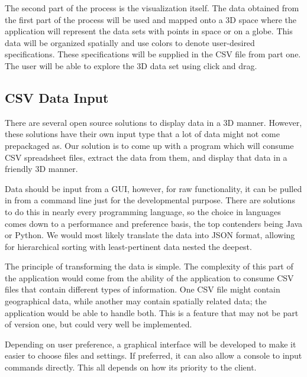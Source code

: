 \documentclass[journal,10pt,onecolumn,compsoc]{IEEEtran} \usepackage[margin=1.0in]{geometry} \usepackage{pdfpages}
\begin{document}
\noindent \newline The second part of the process is the visualization itself. The data obtained from the first part of the process will be used and mapped onto a 3D space where the application will represent the data sets with points in space or on a globe. This data will be organized spatially and use colors to denote user-desired specifications. These specifications will be supplied in the CSV file from part one. The user will be able to explore the 3D data set using click and drag.
    
    \subsection{CSV Data Input}
    There are several open source solutions to display data in a 3D manner. However, these solutions have their own input type that a lot of data might not come prepackaged as. Our solution is to come up with a program which will consume CSV spreadsheet files, extract the data from them, and display that data in a friendly 3D manner.
    
    \noindent \newline Data should be input from a GUI, however, for raw functionality, it can be pulled in from a command line just for the developmental purpose. There are solutions to do this in nearly every programming language, so the choice in languages comes down to a performance and preference basis, the top contenders being Java or Python. We would most likely translate the data into JSON format, allowing for hierarchical sorting with least-pertinent data nested the deepest.
    
    \noindent \newline The principle of transforming the data is simple. The complexity of this part of the application would come from the ability of the application to consume CSV files that contain different types of information. One CSV file might contain geographical data, while another may contain spatially related data; the application would be able to handle both. This is a feature that may not be part of version one, but could very well be implemented.
    
    \noindent \newline Depending on user preference, a graphical interface will be developed to make it easier to choose files and settings. If preferred, it can also allow a console to input commands directly. This all depends on how its priority to the client.
\end{document}
